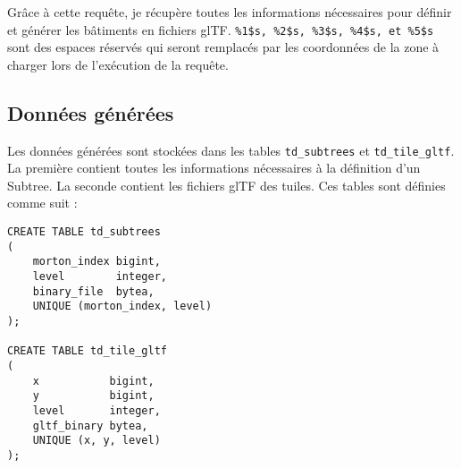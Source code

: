 Grâce à cette requête, je récupère toutes les informations nécessaires pour définir et générer les bâtiments en fichiers glTF. \texttt{\%1\$s, \%2\$s, \%3\$s, \%4\$s, et \%5\$s} sont des espaces réservés qui seront remplacés par les coordonnées de la zone à charger lors de l'exécution de la requête.

\newpage
\subsection{Données générées}

Les données générées sont stockées dans les tables \texttt{td\_subtrees} et \texttt{td\_tile\_gltf}. La première contient toutes les informations nécessaires à la définition d'un Subtree. La seconde contient les fichiers glTF des tuiles. Ces tables sont définies comme suit :

\begin{verbatim}
CREATE TABLE td_subtrees
(
    morton_index bigint,
    level        integer,
    binary_file  bytea,
    UNIQUE (morton_index, level)
);

CREATE TABLE td_tile_gltf
(
    x           bigint,
    y           bigint,
    level       integer,
    gltf_binary bytea,
    UNIQUE (x, y, level)
);
\end{verbatim}